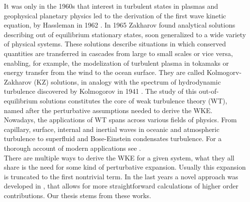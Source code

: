     It was only in the 1960s that interest in turbulent states in plasmas and geophysical planetary physics led to the derivation of the first wave kinetic equation, by Hassleman in 1962 \cite{Hasselmann1962}. In 1965 Zakharov \cite{Zakharov1965} found analytical solutions describing out of equilibrium stationary states, soon generalized to a wide variety of physical systems. These solutions describe situations in which conserved quantities are transferred in cascades from large to small scales or vice versa, enabling, for example, the modelization of  turbulent plasma in tokamaks or energy transfer from the wind to the ocean surface. They are called Kolmogorv-Zakharov (KZ) solutions, in analogy with the spectrum of hydrodynamic turbulence discovered by Kolmogorov in 1941 \cite{1991}. The study of this out-of-equilibrium solutions constitutes the core of weak turbulence theory (WT), named after the perturbative assumptions needed to derive the WKE. \\ 
    Nowadays, the applications of WT spans across various fields of physics. From capillary, surface, internal and inertial waves in oceanic and atmospheric turbulence to superfluid and Bose-Einstein condensates turbulence. For a thorough account of modern applications see \cite{Nazarenko2011}.\\ 
    There are multiple ways to derive the WKE for a given system, what they all share is the need for some kind of perturbative expansion. Usually this expansion is truncated to the first nontrivial term. In the last years a novel approach was developed in \cite{Rosenhaus:2022uwa} \cite{Rosenhaus:2023pdj} \cite{Rosenhaus:2023sik} \cite{Rosenhaus2023}, that allows for more straightforward calculations of higher order contributions. Our thesis stems from these works. \\

